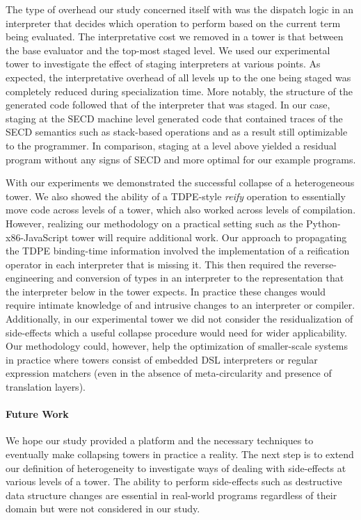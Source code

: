 \documentclass[sigplan,anonymous,review]{acmart}
\theoremstyle{definition}
\begin{document}
The type of overhead our study concerned itself with was the dispatch logic in an interpreter that decides which operation to perform based on the current term being evaluated. The interpretative cost we removed in a tower is that between the base evaluator and the top-most staged level. We used our experimental tower to investigate the effect of staging interpreters at various points. As expected, the interpretative overhead of all levels up to the one being staged was completely reduced during specialization time. More notably, the structure of the generated code followed that of the interpreter that was staged. In our case, staging at the SECD machine level generated code that contained traces of the SECD semantics such as stack-based operations and as a result still optimizable to the programmer. In comparison, staging at a level above yielded a residual program without any signs of SECD and more optimal for our example programs.

With our experiments we demonstrated the successful collapse of a heterogeneous tower. We also showed the ability of a TDPE-style \textit{reify} operation to essentially move code across levels of a tower, which also worked across levels of compilation. However, realizing our methodology on a practical setting such as the Python-x86-JavaScript tower will require additional work. Our approach to propagating the TDPE binding-time information involved the implementation of a reification operator in each interpreter that is missing it. This then required the reverse-engineering and conversion of types in an interpreter to the representation that the interpreter below in the tower expects. In practice these changes would require intimate knowledge of and intrusive changes to an interpreter or compiler. Additionally, in our experimental tower we did not consider the residualization of side-effects which a useful collapse procedure would need for wider applicability. Our methodology could, however, help the optimization of smaller-scale systems in practice where towers consist of embedded DSL interpreters or regular expression matchers (even in the absence of meta-circularity and presence of translation layers).

\paragraph{Future Work}

We hope our study provided a platform and the necessary techniques to eventually make collapsing towers in practice a reality. The next step is to extend our definition of heterogeneity to investigate ways of dealing with side-effects at various levels of a tower. The ability to perform side-effects such as destructive data structure changes are essential in real-world programs regardless of their domain but were not considered in our study.
\end{document}
